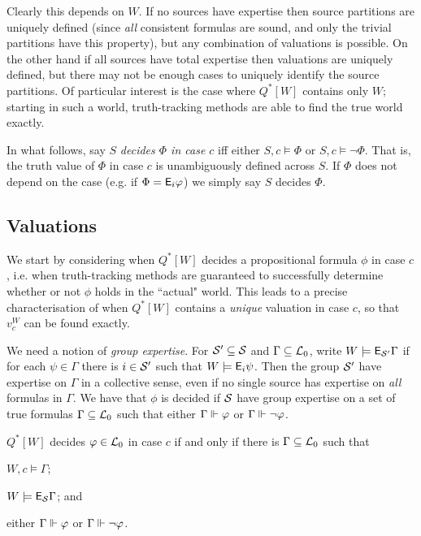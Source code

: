 Clearly this depends on $W$. If no sources have expertise then
source partitions are uniquely defined (since \emph{all} consistent formulas
are sound, and only the trivial partitions have this property), but any
combination of valuations is possible. On the other hand if all sources have
total expertise then valuations are uniquely defined, but there may not be
enough cases to uniquely identify the source partitions. Of particular interest
is the case where $Q^*[W]$ contains only $W$; starting in such a world,
truth-tracking methods are able to find the true world exactly.

In what follows, say $S$ \emph{decides $\Phi$ in case
$c$} iff either $S, c \models \Phi$ or $S, c \models \neg\Phi$. That is, the
truth value of $\Phi$ in case $c$ is unambiguously defined across $S$. If
$\Phi$ does not depend on the case (e.g. if $\Phi = \mathsf{E}_i\varphi$) we simply say
$S$ decides $\Phi$.

\subsection{Valuations}

We start by considering when $Q^*[W]$ decides a propositional formula $\phi$ in
case $c$, i.e. when truth-tracking methods are guaranteed to successfully
determine whether or not $\phi$ holds in the ``actual" world. This leads to a
precise characterisation of when $Q^*[W]$ contains a \emph{unique} valuation in
case $c$, so that $v^W_c$ can be found exactly.

We need a notion of \emph{group expertise}. For $\mathcal{S}' \subseteq \mathcal{S}$ and
$\Gamma \subseteq \mathcal{L}_0$, write $W \models \mathsf{E}_{\mathcal{S}'}{\Gamma}$ if for each
$\psi \in \Gamma$ there is $i \in \mathcal{S}'$ such that $W \models \mathsf{E}_i\psi$. Then
the group $\mathcal{S}'$ have expertise on $\Gamma$ in a collective sense, even if no
single source has expertise on \emph{all} formulas in $\Gamma$.
%
We have that $\phi$ is decided if $\mathcal{S}$ have group expertise on a set of true
formulas $\Gamma \subseteq \mathcal{L}_0$ such that either $\Gamma \Vdash \varphi$
or $\Gamma \Vdash \neg\varphi$.

\begin{theorem}
    \label{thm_decide_phi}
    $Q^*[W]$ decides $\varphi \in \mathcal{L}_0$ in case $c$ if and only if there is
    $\Gamma \subseteq \mathcal{L}_0$ such that
    \begin{inlinelist}
        \item $W, c \models \Gamma$;
        \item $W \models \mathsf{E}_{\mathcal{S}}{\Gamma}$; and
        \item either $\Gamma \Vdash \varphi$ or $\Gamma \Vdash
              \neg\varphi$.
    \end{inlinelist}
\end{theorem}

